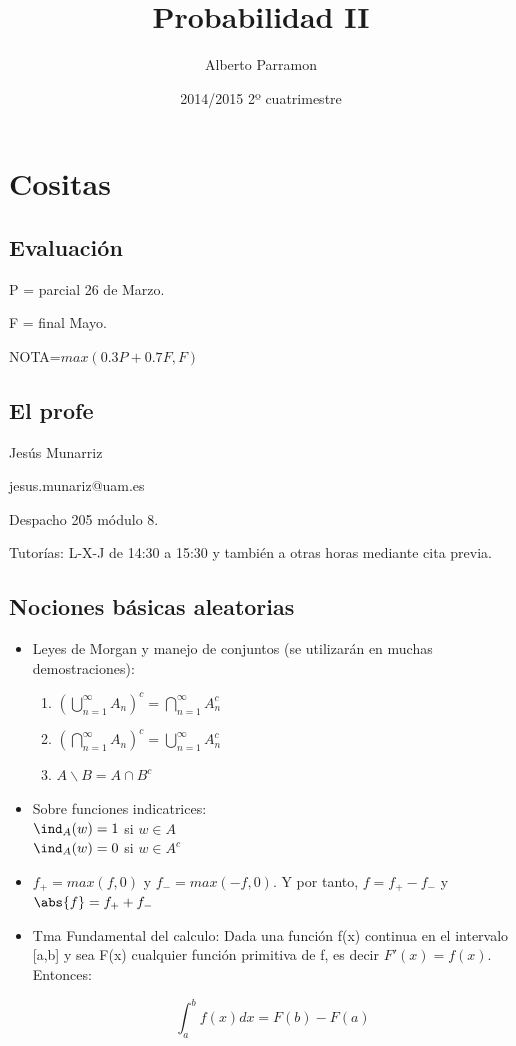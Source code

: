 \documentclass{apuntes}
\author{Alberto Parramon}
\date{2014/2015 2º cuatrimestre}
\title{Probabilidad II}
\begin{document}
\pagestyle{plain}
\maketitle

\tableofcontents
\newpage
\chapter{Cositas}


\section{Evaluación}
P = parcial 26 de Marzo.

F = final Mayo.

NOTA=$max(0.3P+0.7F,F)$ 

\section{El profe}
Jesús Munarriz

jesus.munariz@uam.es

Despacho 205 módulo 8.

Tutorías: L-X-J de 14:30 a 15:30 y también a otras horas mediante cita previa.

\section{Nociones básicas aleatorias}
\begin{itemize}
\item Leyes de Morgan y manejo de conjuntos (se utilizarán en muchas demostraciones):
\begin{enumerate}
\item $(\bigcup_{n=1}^{\infty}A_n)^c = \bigcap_{n=1}^{\infty}A_n^c$
\item $(\bigcap_{n=1}^{\infty}A_n)^c = \bigcup_{n=1}^{\infty}A_n^c$
\item $A \backslash B = A \cap B^c$

\end{enumerate}
\item Sobre funciones indicatrices:\\
$\ind_A(w)=1$ si $w \in A$\\
$\ind_A(w)=0$ si $w \in A^c$

\item $f_+ = max(f,0)$ y $f_- = max(-f,0)$. Y por tanto, $f=f_+ -f_-$ y $\abs{f}=f_+ +f_-$

\item Tma Fundamental del calculo: Dada una función f(x) continua en el intervalo [a,b] y sea F(x) cualquier función primitiva de f, es decir $F '(x) = f(x)$. Entonces:

\[
\int_a^b f(x)dx = F(b)-F(a)
\]
\end{itemize}
\end{document}

